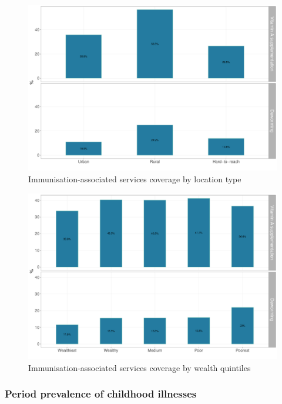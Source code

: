 \documentclass[12pt,a4paper]{article}
\begin{document}
\begin{figure}[H]

{\centering \includegraphics{kayinReport_files/figure-latex/epi5plot-1} 

}

\caption{Immunisation-associated services coverage by location type}\label{fig:epi5plot}
\end{figure}

\begin{figure}[H]

{\centering \includegraphics{kayinReport_files/figure-latex/epi6plot-1} 

}

\caption{Immunisation-associated services coverage by wealth quintiles}\label{fig:epi6plot}
\end{figure}

\hypertarget{illness}{%
\subsubsection{Period prevalence of childhood illnesses}\label{illness}}
\end{document}
